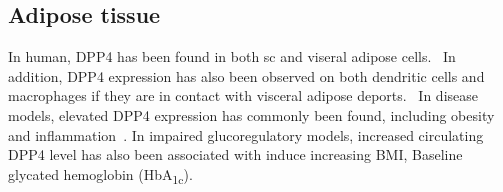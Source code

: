 \subsection{Adipose tissue}
In human, DPP4 has been found in both sc and viseral adipose cells.~\cite{Lamers2011} In addition, DPP4 expression has also been observed on both dendritic cells and macrophages if they are in contact with visceral adipose deports.~\cite{Zhong2013} In disease models, elevated DPP4 expression has commonly been found, including obesity and inflammation~\cite{Zhong2013}. In impaired glucoregulatory models, increased circulating DPP4 level has also been associated with induce increasing BMI, Baseline glycated hemoglobin (HbA\textsubscript{1c}). 
